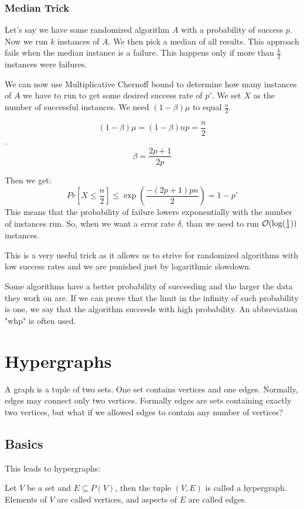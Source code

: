\subsubsection{Median Trick}

Let's say we have some randomized algorithm $A$ with a probability of success $p$. Now we run $k$ instances of $A$. We then pick a median of all results. This approach fails when the median instance is a failure. This happens only if more than $\frac{k}{2}$ instances were failures. 

We can now use Multiplicative Chernoff bound to determine how many instances of $A$ we have to run to get some desired success rate of $p'$. We set $X$ as the number of successful instances. We need $(1-\beta)\mu$ to equal $\frac{n}{2}$. 

$$(1-\beta)\mu = (1-\beta)np = \frac{n}{2}$$. 
$$\beta = \frac{2p + 1}{2p}$$


Then we get: $$Pr[X \leq \frac{n}{2}] \leq \exp \left( \frac{-(2p+1)pn}{2} \right) = 1 - p'$$
This means that the probability of failure lowers exponentially with the number of instances run. So, when we want a error rate $\delta$, than we need to run $\mathcal{O}(\log(\frac{1}{\delta}))$ instances.

This is a very useful trick as it allows us to strive for randomized algorithms with low success rates and we are punished just by logarithmic slowdown.

Some algorithms have a better probability of succeeding and the larger the data they work on are.  If we can prove that the limit in the infinity of such probability is one, we say that the algorithm succeeds with high probability. An abbreviation "whp" is often used.

\section{Hypergraphs}
A graph is a tuple of two sets. One set contains vertices and one edges. Normally, edges may connect only two vertices. Formally edges are sets containing exactly two vertices, but what if we allowed edges to contain any number of vertices? 
\subsection{Basics}
This leads to hypergraphs:

\begin{defn}
    Let \(V\) be a set and \(E \subseteq P(V)\), then the tuple \((V, E)\) is called a hypergraph. Elements of \(V\) are called vertices, and aspects of \(E\) are called edges.
\end{defn}

